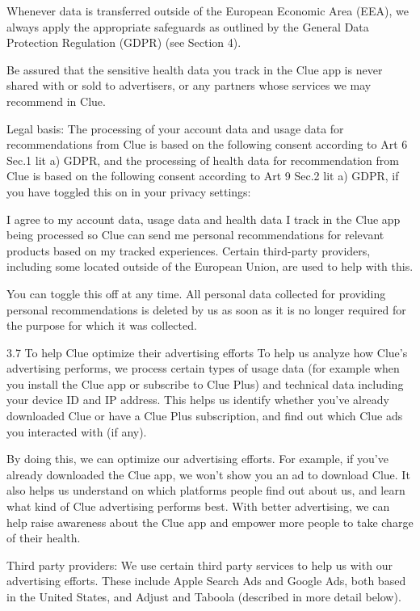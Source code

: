Whenever data is transferred outside of the European Economic Area (EEA), we always apply the appropriate safeguards as outlined by the General Data Protection Regulation (GDPR) (see Section 4).

Be assured that the sensitive health data you track in the Clue app is never shared with or sold to advertisers, or any partners whose services we may recommend in Clue.

Legal basis: The processing of your account data and usage data for recommendations from Clue is based on the following consent according to Art 6 Sec.1 lit a) GDPR, and the processing of health data for recommendation from Clue is based on the following consent according to Art 9 Sec.2 lit a) GDPR, if you have toggled this on in your privacy settings:

I agree to my account data, usage data and health data I track in the Clue app being processed so Clue can send me personal recommendations for relevant products based on my tracked experiences. Certain third-party providers, including some located outside of the European Union, are used to help with this.

You can toggle this off at any time. All personal data collected for providing personal recommendations is deleted by us as soon as it is no longer required for the purpose for which it was collected.

3.7 To help Clue optimize their advertising efforts
To help us analyze how Clue’s advertising performs, we process certain types of usage data (for example when you install the Clue app or subscribe to Clue Plus) and technical data including your device ID and IP address. This helps us identify whether you’ve already downloaded Clue or have a Clue Plus subscription, and find out which Clue ads you interacted with (if any).

By doing this, we can optimize our advertising efforts. For example, if you’ve already downloaded the Clue app, we won’t show you an ad to download Clue. It also helps us understand on which platforms people find out about us, and learn what kind of Clue advertising performs best. With better advertising, we can help raise awareness about the Clue app and empower more people to take charge of their health.

Third party providers: We use certain third party services to help us with our advertising efforts. These include Apple Search Ads and Google Ads, both based in the United States, and Adjust and Taboola (described in more detail below).

